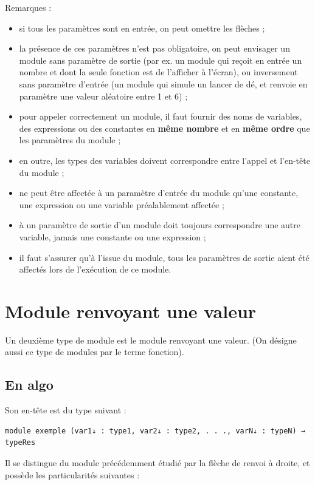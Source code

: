 \documentclass[11pt,a4paper]{article}
\begin{document}
            \par
        
        Remarques : 
        
					\begin{itemize}
				
			\item si tous les param\`etres sont en entr\'ee, on peut omettre les fl\`eches ;
			\item 
              la pr\'esence de ces param\`etres n'est pas obligatoire, on peut envisager un module sans
              param\`etre de sortie (par ex. un module qui re\c coit en entr\'ee un nombre et dont la seule
              fonction est de l'afficher \`a l'\'ecran), ou inversement sans param\`etre d'entr\'ee (un module
              qui simule un lancer de d\'e, et renvoie en param\`etre une valeur al\'eatoire entre 1 et 6) ;
            
			\item 
              pour appeler correctement un module, il faut fournir des noms de variables, des expressions ou des constantes 
              en \textbf{m\^eme nombre} et en \textbf{m\^eme ordre} 
              que les param\`etres du module ;
            
			\item en outre, les types des variables doivent correspondre entre l'appel et l'en-t\^ete du module ;
			\item ne peut \^etre affect\'ee \`a un param\`etre d'entr\'ee du module qu'une constante, une expression ou une variable pr\'ealablement affect\'ee ;
			\item \`a un param\`etre de sortie d'un module doit toujours correspondre une autre variable, jamais une constante ou une expression ;
			\item il faut s'assurer qu'\`a l'issue du module, tous les param\`etres de sortie aient \'et\'e affect\'es lors de l'ex\'ecution de ce module.
					\end{itemize}
				
            \par
        \section{Module renvoyant une valeur}Un deuxi\`eme type de module est le module renvoyant une valeur. 
    (On d\'esigne aussi ce type de modules par le terme fonction).\subsection{En algo}Son en-t\^ete est du type suivant :
            \par
        \begin{verbatim}
module exemple (var1↓ : type1, var2↓ : type2, . . ., varN↓ : typeN) → typeRes
      \end{verbatim}
        Il se distingue du module pr\'ec\'edemment \'etudi\'e par la fl\`eche de renvoi \`a droite,
        et poss\`ede les particularit\'es suivantes :
      
\end{document}
